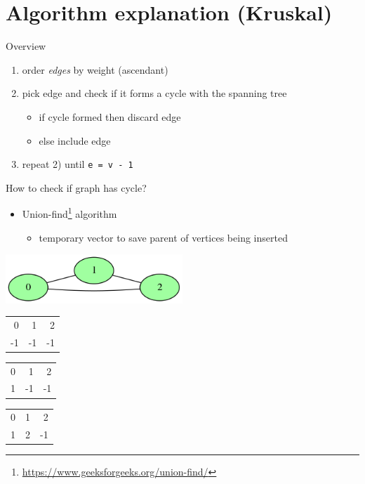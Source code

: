 \documentclass[presentation]{beamer}
\begin{document}
\section{Algorithm explanation (Kruskal)}
\label{sec:orgheadline16}
\begin{frame}[fragile,label={sec:orgheadline5}]{Overview}
 \begin{enumerate}
\item order \emph{edges} by weight (ascendant)
\item pick edge and check if it forms a cycle with the spanning tree
\begin{itemize}
\item if cycle formed then discard edge
\item else include edge
\end{itemize}
\item repeat 2) until \texttt{e = v - 1}
\end{enumerate}
\end{frame}
\begin{frame}[label={sec:orgheadline6}]{How to check if graph has cycle?}
\begin{itemize}
\item Union-find\footnote{\url{https://www.geeksforgeeks.org/union-find/}} algorithm
\begin{itemize}
\item temporary vector to save parent of vertices being inserted
\end{itemize}
\end{itemize}

\begin{center}
\includegraphics[width=0.5\textwidth]{images/union-find-example.png}

\begin{center}
\begin{tabular}{rrr}
0 & 1 & 2\\
-1 & -1 & -1\\
\end{tabular}
\end{center}

\begin{center}
\begin{tabular}{rrr}
\alert{0} & \alert{1} & 2\\
1 & -1 & -1\\
\end{tabular}
\end{center}

\begin{center}
\begin{tabular}{rrr}
0 & \alert{1} & \alert{2}\\
1 & 2 & -1\\
\end{tabular}
\end{center}
\end{center}
\end{frame}
\end{document}
